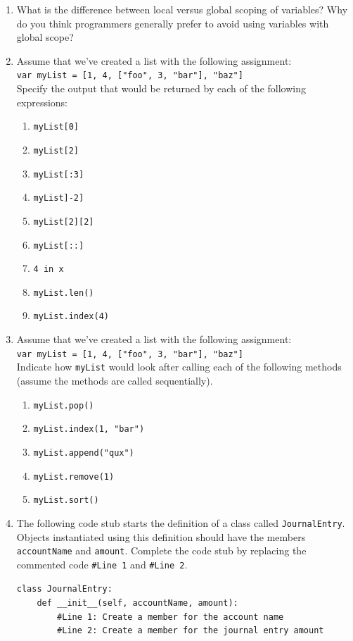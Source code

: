 \documentclass{book}
\begin{document}
\begin{enumerate}
	\item What is the difference between local versus global scoping of variables? Why do you think programmers generally prefer to avoid using variables with global scope?
	\item Assume that we've created a list with the following assignment: \\ \texttt{var myList = [1, 4, ["foo", 3, "bar"], "baz"]}
	\\Specify the output that would be returned by each of the following expressions:
	\begin{enumerate}
		\item \texttt{myList[0]}
		\item \texttt{myList[2]}
		\item \texttt{myList[:3]}
		\item \texttt{myList]-2]}
		\item \texttt{myList[2][2]}
		\item \texttt{myList[::]}
		\item \texttt{4 in x}	
		\item \texttt{myList.len()}
		\item \texttt{myList.index(4)}
	\end{enumerate}
	\item Assume that we've created a list with the following assignment: \\ \texttt{var myList = [1, 4, ["foo", 3, "bar"], "baz"]}
	\\Indicate how \texttt{myList} would look after calling each of the following methods (assume the methods are called sequentially).
	\begin{enumerate}
		\item \texttt{myList.pop()}
		\item \texttt{myList.index(1, "bar")}
		\item \texttt{myList.append("qux")}
		\item \texttt{myList.remove(1)}
		\item \texttt{myList.sort()}
	\end{enumerate}
	\item The following code stub starts the definition of a class called \texttt{JournalEntry}. Objects instantiated using this definition should have the members \\ \texttt{accountName} and \texttt{amount}. Complete the code stub by replacing the commented code \texttt{\#Line 1} and \texttt{\#Line 2}.
	
	\texttt{class JournalEntry: \\ \mbox{~~~~}def \_\_init\_\_(self, accountName, amount): \\ \mbox{~~~~~~~~}\#Line 1: Create a member for the account name \\ \mbox{~~~~~~~~}\#Line 2: Create a member for the journal entry amount}
	
\end{enumerate}
\end{document}

